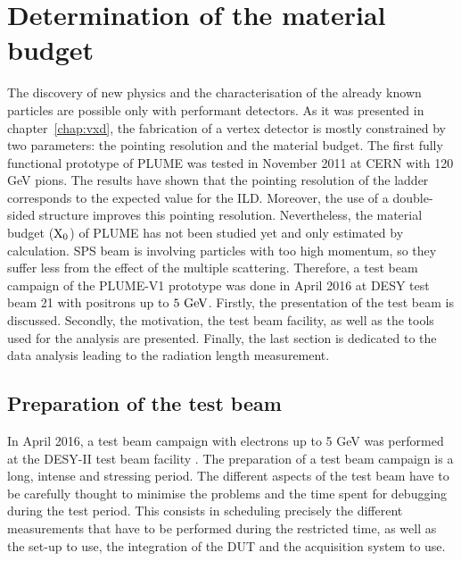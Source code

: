 \chapter{Determination of the material budget}
\label{chap:X0}

  The discovery of new physics and the characterisation of the already known particles are possible only with performant detectors.
  As it was presented in chapter~\ref{chap:vxd}, the fabrication of a vertex detector is mostly constrained by two parameters: the pointing resolution and the material budget.
  The first fully functional prototype of \gls{PLUME} was tested in November 2011 at CERN with 120 GeV pions.
  The results have shown that the pointing resolution of the ladder corresponds to the expected value for the \gls{ILD}.
  Moreover, the use of a double-sided structure improves this pointing resolution. 
  Nevertheless, the material budget ($\rm{X_0}$) of \gls{PLUME} has not been studied yet and only estimated by calculation.
  SPS beam is involving particles with too high momentum, so they suffer less from the effect of the multiple scattering.
  Therefore, a test beam campaign of the PLUME-V1 prototype was done in April 2016 at DESY test beam 21 with positrons up to $5~\rm{GeV}$.
  Firstly, the presentation of the test beam is discussed.
  Secondly, the motivation, the test beam facility, as well as the tools used for the analysis are presented.
  Finally, the last section is dedicated to the data analysis leading to the radiation length measurement.

\minitoc

  \section{Preparation of the test beam}

  In April 2016, a test beam campaign with electrons up to 5 GeV was performed at the DESY-II test beam facility \cite{DESYII}.
  The preparation of a test beam campaign is a long, intense and stressing period.
  The different aspects of the test beam have to be carefully thought to minimise the problems and the time spent for debugging during the test period.
  This consists in scheduling precisely the different measurements that have to be performed during the restricted time, as well as the set-up to use, the integration of the \gls{DUT} and the acquisition system to use.
  
